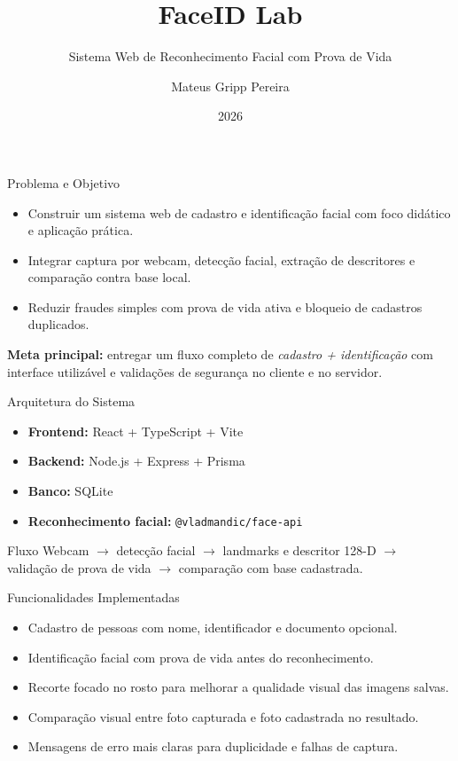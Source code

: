 \documentclass[aspectratio=169,11pt]{beamer}
\title{FaceID Lab}
\subtitle{Sistema Web de Reconhecimento Facial com Prova de Vida}
\author{Mateus Gripp Pereira}
\institute{UFSC -- EEL7815}
\date{2026}
\begin{document}
\begin{frame}
  \titlepage
\end{frame}

\begin{frame}{Problema e Objetivo}
  \begin{itemize}
    \item Construir um sistema web de cadastro e identifica\c{c}\~ao facial com foco did\'atico e aplica\c{c}\~ao pr\'atica.
    \item Integrar captura por webcam, detec\c{c}\~ao facial, extra\c{c}\~ao de descritores e compara\c{c}\~ao contra base local.
    \item Reduzir fraudes simples com prova de vida ativa e bloqueio de cadastros duplicados.
  \end{itemize}

  \vspace{0.6cm}
  \textbf{Meta principal:} entregar um fluxo completo de \textit{cadastro + identifica\c{c}\~ao} com interface utiliz\'avel e valida\c{c}\~oes de seguran\c{c}a no cliente e no servidor.
\end{frame}

\begin{frame}{Arquitetura do Sistema}
  \begin{itemize}
    \item \textbf{Frontend:} React + TypeScript + Vite
    \item \textbf{Backend:} Node.js + Express + Prisma
    \item \textbf{Banco:} SQLite
    \item \textbf{Reconhecimento facial:} \texttt{@vladmandic/face-api}
  \end{itemize}

  \vspace{0.4cm}
  \begin{block}{Fluxo}
    Webcam $\rightarrow$ detec\c{c}\~ao facial $\rightarrow$ landmarks e descritor 128-D $\rightarrow$
    valida\c{c}\~ao de prova de vida $\rightarrow$ compara\c{c}\~ao com base cadastrada.
  \end{block}
\end{frame}

\begin{frame}{Funcionalidades Implementadas}
  \begin{itemize}
    \item Cadastro de pessoas com nome, identificador e documento opcional.
    \item Identifica\c{c}\~ao facial com prova de vida antes do reconhecimento.
    \item Recorte focado no rosto para melhorar a qualidade visual das imagens salvas.
    \item Compara\c{c}\~ao visual entre foto capturada e foto cadastrada no resultado.
    \item Mensagens de erro mais claras para duplicidade e falhas de captura.
  \end{itemize}
\end{frame}
\end{document}
